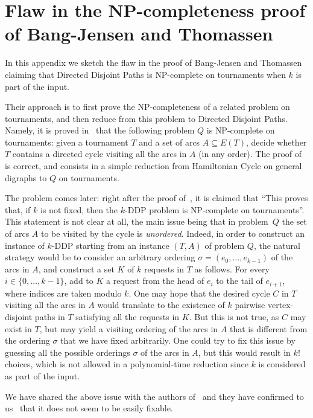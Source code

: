 \documentclass[a4paper,UKenglish,cleveref, autoref, thm-restate]{lipics-v2021}
\renewcommand{\NP}{{\sf NP}\xspace}
\begin{document}
\newpage
\appendix
\section{Flaw in the \NP-completeness proof of Bang-Jensen and Thomassen}
\label{sec:flaw}

In this appendix we sketch the flaw in the proof of Bang-Jensen and Thomassen claiming that {\sc Directed Disjoint Paths} is \NP-complete on tournaments when  $k$ is part of the input.

Their approach is to first prove the \NP-completeness of a related problem on tournaments, and then reduce from this problem to {\sc Directed Disjoint Paths}. Namely, it is proved in~\cite[Theorem 6.1]{thomassen_tournament_nph} that the following problem $Q$ is \NP-complete on tournaments: given a tournament $T$ and a set of arcs $A \subseteq E(T)$, decide whether $T$ contains a directed cycle visiting all the arcs in $A$ (in any order). The proof of~\cite[Theorem 6.1]{thomassen_tournament_nph} is correct, and consists in a simple reduction from {\sc Hamiltonian Cycle} on general digraphs to $Q$ on tournaments.

The problem comes later: right after the proof of~\cite[Theorem 6.1]{thomassen_tournament_nph}, it is claimed that ``This proves that, if $k$ is not fixed, then the $k$-{\sc DDP} problem is \NP-complete on
tournaments''. This statement is not clear at all, the main issue being that in problem~$Q$ the set of arcs $A$ to be visited by the cycle is \emph{unordered}. Indeed, in order to construct an instance of $k$-{\sc DDP} starting from an instance $(T,A)$ of problem $Q$, the natural strategy would be to consider an arbitrary ordering $\sigma=(e_0, \ldots, e_{k-1})$ of the arcs in $A$, and construct a set $K$ of $k$ requests in $T$ as follows. For every $i \in \{0, \ldots, k-1\}$, add to $K$ a request from the head of $e_i$ to the tail of $e_{i+1}$, where indices are taken modulo $k$. One may hope that the desired cycle $C$ in $T$ visiting all the arcs in $A$ would translate to the existence of $k$ pairwise vertex-disjoint paths in $T$ satisfying all the requests in $K$. But this is not true, as $C$ may exist in $T$, but may yield a visiting ordering of the arcs in $A$ that is different from the ordering $\sigma$ that we have fixed arbitrarily. One could try to fix this issue by guessing all the possible orderings $\sigma$ of the arcs in $A$, but this would result in $k!$ choices, which is not allowed in a polynomial-time reduction since $k$ is considered as part of the input.

We have shared the above issue with the authors of~\cite{thomassen_tournament_nph} and they have confirmed to us~\cite{personal-communication} that it does not seem to be easily fixable.
 
\end{document}
